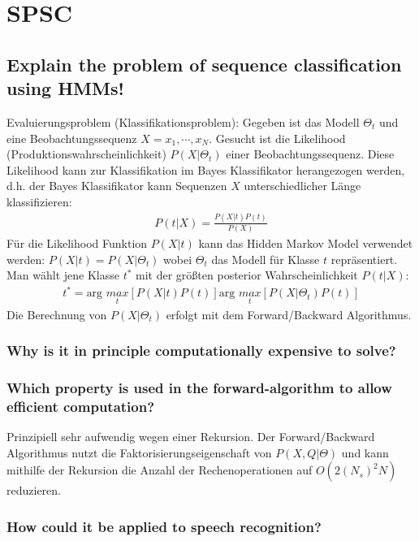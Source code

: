 \documentclass[12pt]{scrartcl}
\begin{document}

\newpage
\pagestyle{spsc-style}

\section{SPSC}

\subsection{Explain the problem of sequence classification using HMMs!}
\label{eval}
Evaluierungsproblem (Klassifikationsproblem): Gegeben ist das Modell $\Theta_t$ und eine Beobachtungssequenz $X = x_1, \cdots ,x_N$. Gesucht ist die Likelihood (Produktionswahrscheinlichkeit) $P(X|\Theta_t)$ einer Beobachtungssequenz. Diese Likelihood kann zur Klassifikation im Bayes Klassifikator herangezogen werden, d.h. der Bayes Klassifikator kann Sequenzen $X$ unterschiedlicher Länge klassifizieren:
\begin{align*}
P(t|X) = \frac{P(X|t)P(t)}{P(X)}
\end{align*}
Für die Likelihood Funktion $P(X|t)$ kann das Hidden Markov Model verwendet werden: $P(X|t)=P(X|\Theta_t)$ wobei $\Theta_t$ das Modell für Klasse $t$ repräsentiert. Man wählt jene Klasse $t^*$ mit der größten posterior Wahrscheinlichkeit $P(t|X)$:
\begin{align*}
t^* = \text{arg }\underset{t}{max}[P(X|t)P(t)] \text{arg }\underset{t}{max}[P(X|\Theta_t)P(t)]
\end{align*}
Die Berechnung von $P(X|\Theta_t)$ erfolgt mit dem Forward/Backward Algorithmus.

\subsubsection{Why is it in principle computationally expensive to solve?}
\subsubsection{Which property is used in the forward-algorithm to allow efficient computation?}

Prinzipiell sehr aufwendig wegen einer Rekursion.
Der Forward/Backward Algorithmus nutzt die Faktorisierungseigenschaft von $P(X,Q|\Theta)$ und kann mithilfe der Rekursion die Anzahl der Rechenoperationen auf $O(2(N_s)^2N)$ reduzieren.

\subsubsection{How could it be applied to speech recognition?}
\end{document}
